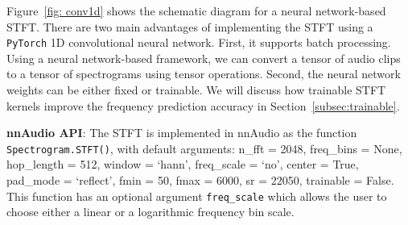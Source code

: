\documentclass{ieeeaccess}
\newcommand{\nbh}[1]{\texttt{#1}}
\begin{document}



Figure~\ref{fig: conv1d} shows the schematic diagram for a neural network-based STFT. There are two main advantages of implementing the STFT using a \nbh{PyTorch} 1D convolutional neural network. First, it supports batch processing. Using a neural network-based framework, we can convert a tensor of audio clips to a tensor of spectrograms using tensor operations. Second, the neural network weights can be either fixed or trainable. We will discuss how trainable STFT kernels improve the frequency prediction accuracy in Section~\ref{subsec:trainable}. 

\hspace{11pt} 

\noindent \textbf{nnAudio API}: The STFT is implemented in nnAudio as the function \nbh{Spectrogram.STFT()}, with default arguments: n\_fft = 2048, freq\_bins = None, hop\_length = 512, window = `hann', freq\_scale = `no', center = True, pad\_mode = `reflect', fmin = 50, fmax = 6000, sr = 22050, trainable = False. This function has an optional argument \nbh{freq\_scale} which allows the user to choose either a linear or a logarithmic frequency bin scale.
\end{document}

